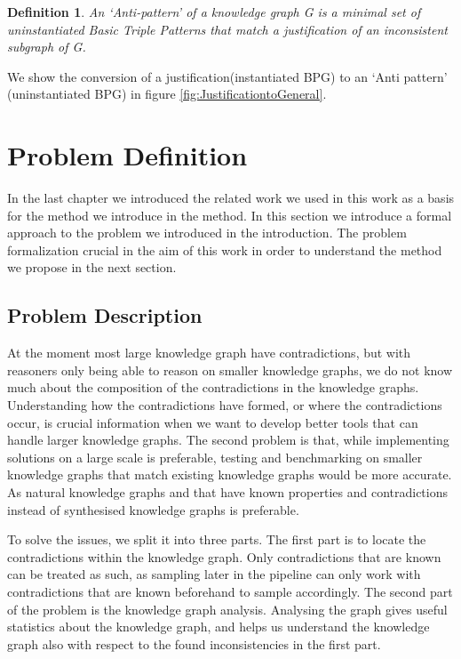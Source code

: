 \documentclass{article}
\newtheorem{definition}{Definition}
\begin{document}
\begin{definition} 
	An \textit{`Anti-pattern'} \textit{of a knowledge graph G is a minimal set of uninstantiated Basic Triple Patterns that match a justification of an inconsistent subgraph of G.}
\end{definition}

We show the conversion of a justification(instantiated BPG) to an `Anti pattern' (uninstantiated BPG) in figure \ref{fig:JustificationtoGeneral}.



\newpage
\section{Problem Definition}
In the last chapter we introduced the related work we used in this work as a basis for the method we introduce in the method. In this section we introduce a formal approach to the problem we introduced in the introduction. The problem formalization crucial in the aim of this work in order to understand the method we propose in the next section.

\subsection{Problem Description}
At the moment most large knowledge graph have contradictions, but with reasoners only being able to reason on smaller knowledge graphs, we do not know much about the composition of the contradictions in the knowledge graphs. Understanding how the contradictions have formed, or where the contradictions occur, is crucial information when we want to develop better tools that can handle larger knowledge graphs. The second problem is that, while implementing solutions on a large scale is preferable, testing and benchmarking on smaller knowledge graphs that match existing knowledge graphs would be more accurate. As natural knowledge graphs and that have known properties and contradictions instead of synthesised knowledge graphs is preferable. 

To solve the issues, we split it into three parts. The first part is to locate the contradictions within the knowledge graph. Only contradictions that are known can be treated as such, as sampling later in the pipeline can only work with contradictions that are known beforehand to sample accordingly.
The second part of the problem is the knowledge graph analysis. Analysing the graph gives useful statistics about the knowledge graph, and helps us understand the knowledge graph also with respect to the found inconsistencies in the first part.
\end{document}
